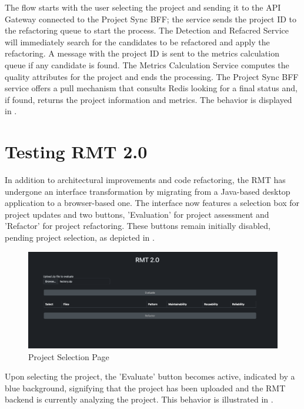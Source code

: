 The flow starts with the user selecting the project and sending it to the API Gateway connected to the Project Sync BFF; the service sends the project ID to the refactoring queue to start the process. The Detection and Refacred Service will immediately search for the candidates to be refactored and apply the refactoring. A message with the project ID is sent to the metrics calculation queue if any candidate is found. The Metrics Calculation Service computes the quality attributes for the project and ends the processing. The Project Sync BFF service offers a pull mechanism that consults Redis looking for a final status and, if found, returns the project information and metrics. The behavior is displayed in .

\section{Testing RMT 2.0}
\label{sec-tests-2.0}

In addition to architectural improvements and code refactoring, the RMT has undergone an interface transformation by migrating from a Java-based desktop application to a browser-based one. The interface now features a selection box for project updates and two buttons, 'Evaluation' for project assessment and 'Refactor' for project refactoring. These buttons remain initially disabled, pending project selection, as depicted in .

\begin{figure}[ht!]
\SetCaptionWidth{\textwidth}
\caption{Project Selection Page}
\label{fig-factory-start}
\includegraphics[width =\textwidth]{Chapter-5/Figures/rmt-factory-client-start.png}
\end{figure}
\FloatBarrier

Upon selecting the project, the 'Evaluate' button becomes active, indicated by a blue background, signifying that the project has been uploaded and the RMT backend is currently analyzing the project. This behavior is illustrated in .

